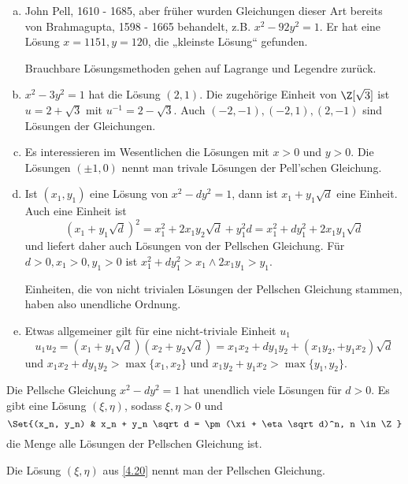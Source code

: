 \begin{nt} \label{4.19}
	\begin{enumerate}[a)]
		\item
			John Pell, 1610 - 1685, aber früher wurden Gleichungen dieser Art bereits von Brahmagupta, 1598 - 1665 behandelt, z.B. $x^2 - 92 y^2 = 1$.
			Er hat eine Lösung $x = 1151, y = 120$, die „kleinste Lösung“ gefunden.

			Brauchbare Lösungsmethoden gehen auf Lagrange und Legendre zurück.
		\item
			$x^2 - 3y^2 = 1$ hat die Lösung $(2,1)$.
			Die zugehörige Einheit von $\Z[\sqrt 3]$ ist $u = 2 + \sqrt 3$ mit $u^{-1} = 2 - \sqrt 3$.
			Auch $(-2, -1), (-2, 1), (2, -1)$ sind Lösungen der Gleichungen.
		\item
			Es interessieren im Wesentlichen die Lösungen mit $x > 0$ und $y > 0$.
			Die Lösungen $(\pm 1, 0)$ nennt man trivale Lösungen der Pell'schen Gleichung.
		\item
			Ist $(x_1, y_1)$ eine Lösung von $x^2 - dy^2 = 1$, dann ist $x_1 + y_1 \sqrt d$ eine Einheit.
			Auch eine Einheit ist
			\[
				(x_1 + y_1 \sqrt d)^2
				= x_1^2 + 2x_1 y_2 \sqrt d + y_1^2 d
				= x_1^2 + dy_1^2 + 2x_1 y_1 \sqrt d
			\]
			und liefert daher auch Lösungen von der Pellschen Gleichung.
			Für $d > 0, x_1 > 0, y_1 > 0$ ist $x_1^2 + dy_1^2 > x_1 \land 2x_1y_1 > y_1$.

			Einheiten, die von nicht trivialen Lösungen der Pellschen Gleichung stammen, haben also unendliche Ordnung.
		\item
			Etwas allgemeiner gilt für eine nicht-triviale Einheit $u_1$
			\[
				u_1 u_2 = (x_1 + y_1 \sqrt d)(x_2 + y_2 \sqrt d)
				= x_1 x_2 + dy_1 y_2 + (x_1 y_2, + y_1 x_2) \sqrt d
			\]
			und $x_1 x_2 + dy_1y_2 > \max\{x_1, x_2\}$ und $x_1y_2 + y_1 x_2 > \max \{y_1, y_2\}$.
	\end{enumerate}
\end{nt}

\begin{st} \label{4.20}
	Die Pellsche Gleichung $x^2 - dy^2 = 1$ hat unendlich viele Lösungen für $d > 0$.
	Es gibt eine Lösung $(\xi, \eta)$, sodass $\xi, \eta > 0$ und
	\[
		\Set{(x_n, y_n) & x_n + y_n \sqrt d = \pm (\xi + \eta \sqrt d)^n, n \in \Z }
	\]
	die Menge alle Lösungen der Pellschen Gleichung ist.
\end{st}

\begin{df} \label{4.21}
	Die Lösung $(\xi, \eta)$ aus \ref{4.20} nennt man  der Pellschen Gleichung.
\end{df}

